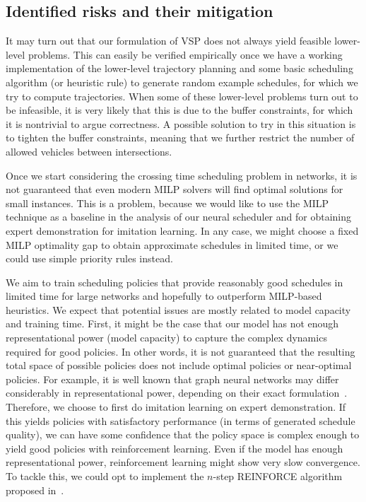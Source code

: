 \documentclass{article}
\theoremstyle{definition}
\theoremstyle{plain}
\begin{document}
\subsection{Identified risks and their mitigation}

It may turn out that our formulation of VSP does not always yield feasible
lower-level problems. This can easily be verified empirically once we have a
working implementation of the lower-level trajectory planning and some basic
scheduling algorithm (or heuristic rule) to generate random example schedules,
for which we try to compute trajectories. When some of these lower-level
problems turn out to be infeasible, it is very likely that this is due to the
buffer constraints, for which it is nontrivial to argue correctness. A possible
solution to try in this situation is to tighten the buffer constraints, meaning
that we further restrict the number of allowed vehicles between intersections.

Once we start considering the crossing time scheduling problem in networks, it
is not guaranteed that even modern MILP solvers will find optimal solutions for
small instances. This is a problem, because we would like to use the MILP
technique as a baseline in the analysis of our neural scheduler and for
obtaining expert demonstration for imitation learning. In any case, we might
choose a fixed MILP optimality gap to obtain approximate schedules in limited
time, or we could use simple priority rules instead.

We aim to train scheduling policies that provide reasonably good schedules in
limited time for large networks and hopefully to outperform MILP-based
heuristics. We expect that potential issues are mostly related to model capacity
and training time.
First, it might be the case that our model has not enough representational power
(model capacity) to capture the complex dynamics required for good policies. In
other words, it is not guaranteed that the resulting total space of possible
policies does not include optimal policies or near-optimal policies. For
example, it is well known that graph neural networks may differ considerably in
representational power, depending on their exact
formulation~\cite{xuHowPowerfulAre2019}.
%
Therefore, we choose to first do imitation learning on expert demonstration. If
this yields policies with satisfactory performance (in terms of generated
schedule quality), we can have some confidence that the policy space is complex
enough to yield good policies with reinforcement learning.
Even if the model has enough representational power, reinforcement learning
might show very slow convergence. To tackle this, we could opt to implement the
$n$-step REINFORCE algorithm proposed in~\cite{zhangDeepReinforcementLearning2024}.
\end{document}
